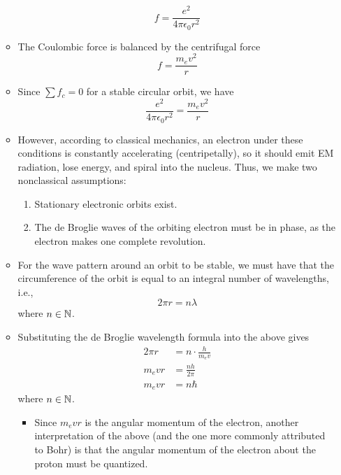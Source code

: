 \documentclass[../notes.tex]{subfiles}
\begin{document}
\begin{itemize}
\begin{itemize}
        \begin{equation*}
            f = \frac{e^2}{4\pi\epsilon_0r^2}
        \end{equation*}
        \item The Coulombic force is balanced by the centrifugal force
        \begin{equation*}
            f = \frac{m_ev^2}{r}
        \end{equation*}
        \item Since $\sum f_c=0$ for a stable circular orbit, we have
        \begin{equation*}
            \frac{e^2}{4\pi\epsilon_0r^2} = \frac{m_ev^2}{r}
        \end{equation*}
        \item However, according to classical mechanics, an electron under these conditions is constantly accelerating (centripetally), so it should emit EM radiation, lose energy, and spiral into the nucleus. Thus, we make two nonclassical assumptions:
        \begin{enumerate}
            \item Stationary electronic orbits exist.
            \item The de Broglie waves of the orbiting electron must be in phase, as the electron makes one complete revolution.
        \end{enumerate}
        \item For the wave pattern around an orbit to be stable, we must have that the circumference of the orbit is equal to an integral number of wavelengths, i.e.,
        \begin{equation*}
            2\pi r = n\lambda
        \end{equation*}
        where $n\in\mathbb{N}$.
        \item Substituting the de Broglie wavelength formula into the above gives
        \begin{align*}
            2\pi r &= n\cdot\frac{h}{m_ev}\\
            m_evr &= \frac{nh}{2\pi}\\
            m_evr &= n\hbar
        \end{align*}
        where $n\in\mathbb{N}$.
        \begin{itemize}
            \item Since $m_evr$ is the angular momentum of the electron, another interpretation of the above (and the one more commonly attributed to Bohr) is that the angular momentum of the electron about the proton must be quantized.

\end{itemize}
\end{itemize}
\end{itemize}
\end{document}
